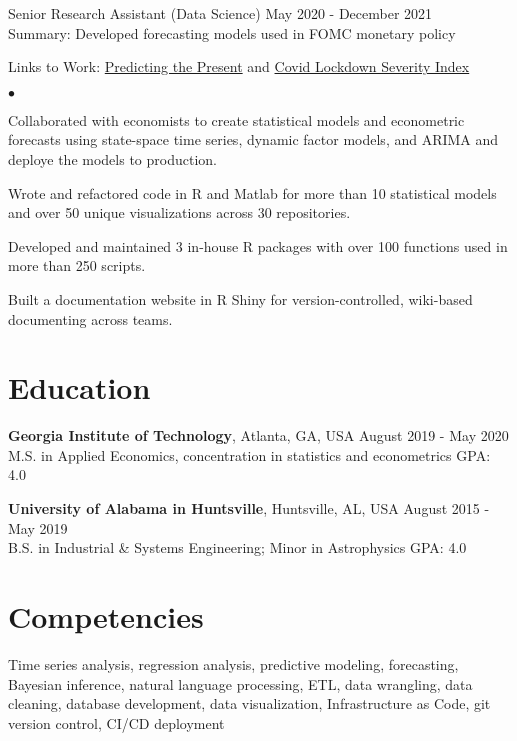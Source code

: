 \documentclass[margin, line]{res}
\newenvironment{list2}{
  \begin{list}{$\bullet$}{%
      \setlength{\itemsep}{0.04in}
      \setlength{\parsep}{0in} \setlength{\parskip}{0in}
      \setlength{\topsep}{0.05in} \setlength{\partopsep}{0in} 
      \setlength{\leftmargin}{\dimexpr 26pt-0.05in}}}
    {\end{list}}
\begin{document}
\begin{resume}
Senior Research Assistant (Data Science) \hfill May 2020 - December 2021 \\
\hspace*{3mm}
    Summary: Developed forecasting models used in FOMC monetary policy
\vspace{-3mm}

\hspace*{3mm}
    Links to Work:  \href{https://michaelboerman.medium.com/predicting-the-present-a56ff704af0b}{Predicting the Present} and   \href{https://github.com/michaelboerman/lockdown_severity_index#readme}{Covid Lockdown Severity Index}
    
    \begin{list2}
        \item Collaborated with economists to create statistical models and econometric forecasts using state-space time series, dynamic factor models, and ARIMA and deploye the models to production.
        \item Wrote and refactored code in R and Matlab for more than 10 statistical models and over 50 unique visualizations across 30 repositories. 
        \item Developed and maintained 3 in-house R packages with over 100 functions used in more than 250 scripts.
        \item Built a documentation website in R Shiny for version-controlled, wiki-based documenting across teams.
    \end{list2}


\section{\sc Education }

{\bf Georgia Institute of Technology}, Atlanta, GA, USA \hfill August 2019 - May 2020\\
M.S. in Applied Economics, concentration in statistics and econometrics \hfill GPA: 4.0


{\bf University of Alabama in Huntsville}, Huntsville, AL, USA \hfill August 2015 - May 2019 \\
B.S. in Industrial \& Systems Engineering; Minor in Astrophysics \hfill GPA: 4.0

\section{\sc Competencies} 
Time series analysis, regression analysis, predictive modeling, forecasting, Bayesian inference, natural language processing, ETL, data wrangling, data cleaning, database development, data visualization, Infrastructure as Code, git version control, CI/CD deployment


\end{resume}
\end{document}
